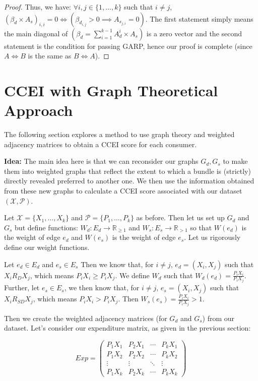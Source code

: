 \documentclass{article} %
\begin{document}
\begin{proof}
Thus, we have: $\forall i, j\in\{1,\ldots,k\}$ such that $i\not=j$, $(\beta_d\times A_s)_{i,i}=0 \iff (\beta_{d_{i,j}}>0 \implies A_{s_{j,i}}=0)$. The first statement simply means the main diagonal of $(\beta_d=\sum_{i=1}^{k-1}A_{d}^{i}\times A_s)$ is a zero vector and the second statement is the condition for passing GARP, hence our proof is complete (since $A\iff B$ is the same as $B\iff A$).
\end{proof}

\section{CCEI with Graph Theoretical Approach}

The following section explores a method to use graph theory and weighted adjacency matrices to obtain a CCEI score for each consumer. 
\bigskip

\textbf{Idea:} The main idea here is that we can reconsider our graphs $G_d, G_s$ to make them into weighted graphs that reflect the extent to which a bundle is (strictly) directly revealed preferred to another one. We then use the information obtained from these new graphs to calculate a CCEI score associated with our dataset $(\mathcal{X},\mathcal{P})$.
\bigskip

Let $\mathcal{X}=\{X_1,\ldots,X_k\}$ and $\mathcal{P}=\{P_1,\ldots,P_k\}$ as before. Then let us set up $G_d$ and $G_s$ but define functions: $W_d:E_d \to\mathbb{R}_{\geq1}$ and $W_s:E_s \to\mathbb{R}_{>1}$ so that $W(e_d)$ is the weight of edge $e_d$ and $W(e_s)$ is the weight of edge $e_s$. Let us rigorously define our weight functions.
\bigskip

Let $e_d \in E_d$ and $e_s\in E_s$ Then we know that, for $i\not=j$, $e_d=(X_i, X_j)$ such that $X_i R_D X_j$, which means $P_iX_i\geq P_iX_j$. We define $W_d$ such that $W_d(e_d)=\frac{P_iX_i}{P_iX_j}$. Further, let $e_s\in E_s$, we then know that, for $i\not=j$, $e_s=(X_i, X_j)$ such that $X_i R_{SD} X_j$, which means $P_iX_i>P_iX_j$. Then $W_s(e_s)=\frac{P_iX_i}{P_iX_j}>1$.
\bigskip

Then we create the weighted adjacency matrices (for $G_d$ and $G_s$) from our dataset. Let's consider our expenditure matrix, as given in the previous section:

\[
Exp = 
 \begin{pmatrix}
  P_1X_1 & P_2X_1 & \cdots & P_kX_1 \\
  P_1X_2 & P_2X_2 & \cdots & P_kX_2 \\
  \vdots  & \vdots  & \ddots & \vdots  \\
  P_1X_k & P_2X_k & \cdots & P_kX_k
 \end{pmatrix}
\]
\end{document}
